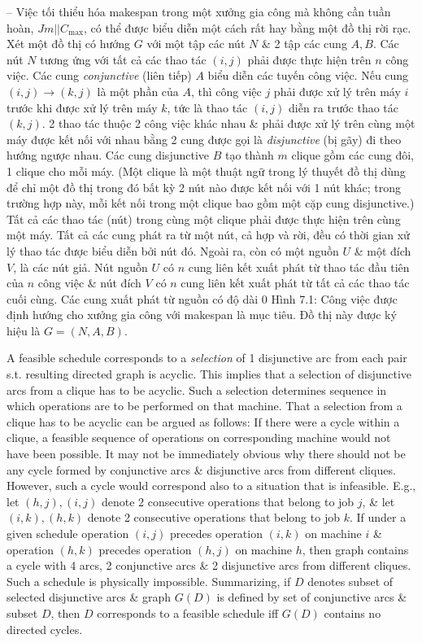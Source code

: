 \documentclass{article}
\begin{document}
\begin{itemize}
\begin{itemize}
        -- Việc tối thiểu hóa makespan trong một xưởng gia công mà không cần tuần hoàn, $Jm||C_{\max}$, có thể được biểu diễn một cách rất hay bằng một đồ thị rời rạc. Xét một đồ thị có hướng $G$ với một tập các nút $N$ \& 2 tập các cung $A,B$. Các nút $N$ tương ứng với tất cả các thao tác $(i,j)$ phải được thực hiện trên $n$ công việc. Các cung {\it conjunctive} (liên tiếp) $A$ biểu diễn các tuyến công việc. Nếu cung $(i,j)\to(k,j)$ là một phần của $A$, thì công việc $j$ phải được xử lý trên máy $i$ trước khi được xử lý trên máy $k$, tức là thao tác $(i,j)$ diễn ra trước thao tác $(k,j)$. 2 thao tác thuộc 2 công việc khác nhau \& phải được xử lý trên cùng một máy được kết nối với nhau bằng 2 cung được gọi là {\it disjunctive} (bị gãy) đi theo hướng ngược nhau. Các cung disjunctive $B$ tạo thành $m$ clique gồm các cung đôi, 1 clique cho mỗi máy. (Một clique là một thuật ngữ trong lý thuyết đồ thị dùng để chỉ một đồ thị trong đó bất kỳ 2 nút nào được kết nối với 1 nút khác; trong trường hợp này, mỗi kết nối trong một clique bao gồm một cặp cung disjunctive.) Tất cả các thao tác (nút) trong cùng một clique phải được thực hiện trên cùng một máy. Tất cả các cung phát ra từ một nút, cả hợp và rời, đều có thời gian xử lý thao tác được biểu diễn bởi nút đó. Ngoài ra, còn có một nguồn $U$ \& một đích $V$, là các nút giả. Nút nguồn $U$ có $n$ cung liên kết xuất phát từ thao tác đầu tiên của $n$ công việc \& nút đích $V$ có $n$ cung liên kết xuất phát từ tất cả các thao tác cuối cùng. Các cung xuất phát từ nguồn có độ dài 0 {\sf Hình 7.1: Công việc được định hướng cho xưởng gia công với makespan là mục tiêu}. Đồ thị này được ký hiệu là $G = (N,A,B)$.

        A feasible schedule corresponds to a {\it selection} of 1 disjunctive arc from each pair s.t. resulting directed graph is acyclic. This implies that a selection of disjunctive arcs from a clique has to be acyclic. Such a selection determines sequence in which operations are to be performed on that machine. That a selection from a clique has to be acyclic can be argued as follows: If there were a cycle within a clique, a feasible sequence of operations on corresponding machine would not have been possible. It may not be immediately obvious why there should not be any cycle formed by conjunctive arcs \& disjunctive arcs from different cliques. However, such a cycle would correspond also to a situation that is infeasible. E.g., let $(h,j),(i,j)$ denote 2 consecutive operations that belong to job $j$, \& let $(i,k),(h,k)$ denote 2 consecutive operations that belong to job $k$. If under a given schedule operation $(i,j)$ precedes operation $(i,k)$ on machine $i$ \& operation $(h,k)$ precedes operation $(h,j)$ on machine $h$, then graph contains a cycle with 4 arcs, 2 conjunctive arcs \& 2 disjunctive arcs from different cliques. Such a schedule is physically impossible. Summarizing, if $D$ denotes subset of selected disjunctive arcs \& graph $G(D)$ is defined by set of conjunctive arcs \& subset $D$, then $D$ corresponds to a feasible schedule iff $G(D)$ contains no directed cycles.


\end{itemize}
\end{itemize}
\end{document}
